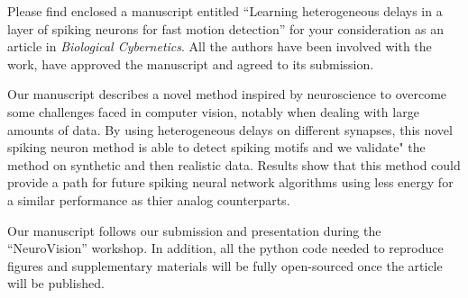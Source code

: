 \documentclass[10pt,stdletter,dateno,sigleft]{newlfm}
\begin{document}
\begin{newlfm}



Please find enclosed a manuscript entitled ``Learning heterogeneous delays in a layer of spiking neurons for fast motion detection'' for your consideration as an article in \emph{Biological Cybernetics}. All the authors have been involved with the work, have approved the manuscript and agreed to its submission.

Our manuscript describes a novel method inspired by neuroscience to overcome some challenges faced in computer vision, notably when dealing with large amounts of data. By using heterogeneous delays on different synapses, this novel spiking neuron method is able to detect spiking motifs and we validate" the method on synthetic and then realistic data. Results show that this method could provide a path for future spiking neural network algorithms using less energy for a similar performance as thier analog counterparts.

Our  manuscript follows our submission and presentation during the ``NeuroVision'' workshop. In addition, all the python code needed to reproduce figures and supplementary materials will be fully open-sourced once the article will be published.

\end{newlfm}
\end{document}
